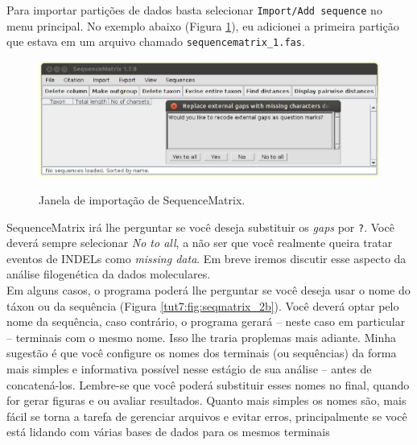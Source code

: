 \begin{refsection}

Para importar partições de dados basta selecionar \texttt{Import/Add sequence} no menu principal. No exemplo abaixo (Figura \ref{tut7:fig:seqmatrix_2}), eu adicionei a primeira partição que estava em um arquivo chamado \texttt{sequencematrix\_1.fas}.


  \begin{figure}[H]
       \centering
      {\includegraphics[scale=0.5]{figures/tut7/seqmatrix_2.eps}}
	{\caption[Janela de importanção de SequenceMatrix]{Janela de importação de SequenceMatrix.}\label{tut7:fig:seqmatrix_2}}
  \end{figure}


SequenceMatrix irá lhe perguntar se você deseja substituir os \textit{gaps} por \texttt{?}. Você deverá sempre selecionar \textit{No to all}, a não ser que você realmente queira tratar eventos de INDELs como \textit{missing data}. Em breve iremos discutir esse aspecto da análise filogenética da dados moleculares.\\


Em alguns casos, o programa poderá lhe perguntar se você deseja usar o nome do táxon ou da sequência (Figura \ref{tut7:fig:seqmatrix_2b}). Você deverá optar pelo nome da sequência, caso contrário, o programa gerará -- neste caso em particular -- terminais com o mesmo nome. Isso lhe traria proplemas mais adiante. Minha sugestão é que você configure os nomes dos terminais (ou sequências) da forma mais simples e informativa possível nesse estágio de sua análise -- antes de concatená-los. Lembre-se que você poderá substituir esses nomes no final, quando for gerar figuras e ou avaliar resultados. Quanto mais simples os nomes são, mais fácil se torna a tarefa de gerenciar arquivos e evitar erros, principalmente se você está lidando com várias bases de dados para os mesmos terminais



\end{refsection}
